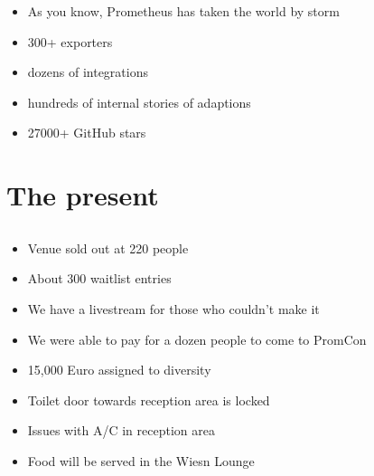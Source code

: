 \documentclass[t]{beamer}
\begin{document}
\begin{frame}
	\vfill
	\begin{itemize}
		\item As you know, Prometheus has taken the world by storm
		\item 300+ exporters
		\item dozens of integrations
		\item hundreds of internal stories of adaptions
		\item 27000+ GitHub stars
	\end{itemize}
	\vfill
\end{frame}

\section{The present}

\subsection{}

\begin{frame}
	\vfill
	\begin{itemize}
		\item Venue sold out at 220 people
		\item About 300 waitlist entries
		\item We have a livestream for those who couldn't make it
	\end{itemize}
	\vfill
\end{frame}

\begin{frame}
	\vfill
	\begin{itemize}
		\item We were able to pay for a dozen people to come to PromCon
		\item 15,000 Euro assigned to diversity
	\end{itemize}
	\vfill
\end{frame}


\begin{frame}
	\vfill
	\begin{itemize}
		\item Toilet door towards reception area is locked
		\item Issues with A/C in reception area
		\item Food will be served in the Wiesn Lounge
	\end{itemize}
	\vfill
\end{frame}
\end{document}
